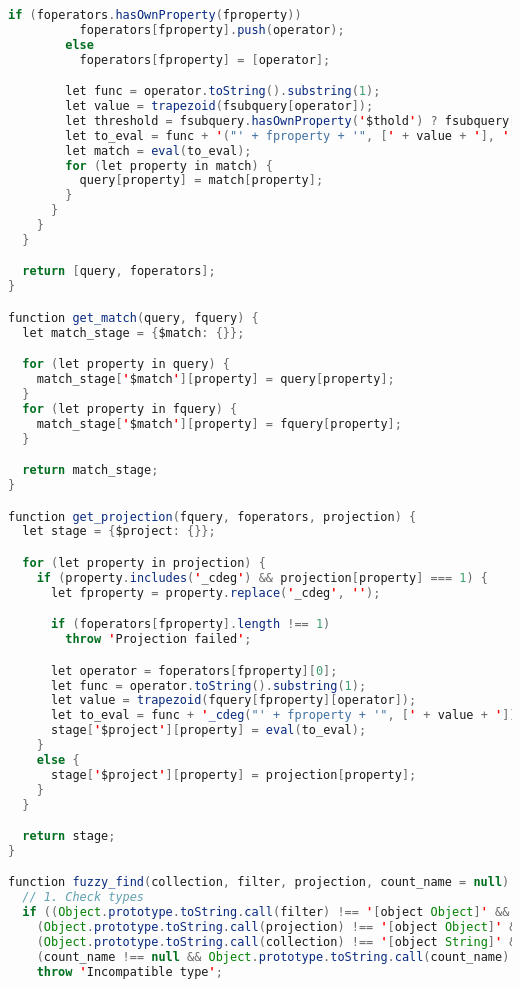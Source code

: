 \begin{lstlisting}[language=java, escapechar=|]
        if (foperators.hasOwnProperty(fproperty))
          foperators[fproperty].push(operator);
        else
          foperators[fproperty] = [operator];

        let func = operator.toString().substring(1);
        let value = trapezoid(fsubquery[operator]);
        let threshold = fsubquery.hasOwnProperty('$thold') ? fsubquery['$thold'] : 0;
        let to_eval = func + '("' + fproperty + '", [' + value + '], ' + threshold + ')';
        let match = eval(to_eval);
        for (let property in match) {
          query[property] = match[property];
        }
      }
    }
  }

  return [query, foperators];
}

function get_match(query, fquery) {
  let match_stage = {$match: {}};

  for (let property in query) {
    match_stage['$match'][property] = query[property];
  }
  for (let property in fquery) {
    match_stage['$match'][property] = fquery[property];
  }

  return match_stage;
}

function get_projection(fquery, foperators, projection) {
  let stage = {$project: {}};

  for (let property in projection) {
    if (property.includes('_cdeg') && projection[property] === 1) {
      let fproperty = property.replace('_cdeg', '');

      if (foperators[fproperty].length !== 1)
        throw 'Projection failed';

      let operator = foperators[fproperty][0];
      let func = operator.toString().substring(1);
      let value = trapezoid(fquery[fproperty][operator]);
      let to_eval = func + '_cdeg("' + fproperty + '", [' + value + '])';
      stage['$project'][property] = eval(to_eval);
    }
    else {
      stage['$project'][property] = projection[property];
    }
  }

  return stage;
}

function fuzzy_find(collection, filter, projection, count_name = null) {
  // 1. Check types
  if ((Object.prototype.toString.call(filter) !== '[object Object]' && Object.prototype.toString.call(filter) !== '[object BSON]') ||
    (Object.prototype.toString.call(projection) !== '[object Object]' && Object.prototype.toString.call(filter) !== '[object BSON]') ||
    (Object.prototype.toString.call(collection) !== '[object String]' && Object.prototype.toString.call(filter) !== '[object BSON]') ||
    (count_name !== null && Object.prototype.toString.call(count_name) !== '[object String]'))
    throw 'Incompatible type';


\end{lstlisting}

